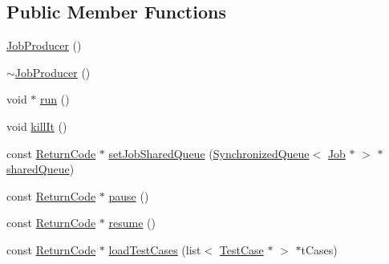 \subsection*{Public Member Functions}
\begin{DoxyCompactItemize}
\item 
\hyperlink{classit_1_1testbench_1_1rte_1_1JobProducer_a5632a8fd49a9c6f6d6ffcc5aa0037791}{Job\-Producer} ()
\item 
\hyperlink{classit_1_1testbench_1_1rte_1_1JobProducer_a46af385e038be508f33fa244d8d4349a}{$\sim$\-Job\-Producer} ()
\item 
void $\ast$ \hyperlink{classit_1_1testbench_1_1rte_1_1JobProducer_a48012263e93f1bcc93f8b0712e6b038a}{run} ()
\item 
void \hyperlink{classit_1_1testbench_1_1rte_1_1JobProducer_ad2c504317992d48438484898ee33b8d8}{kill\-It} ()
\item 
const \hyperlink{structit_1_1testbench_1_1data_1_1ReturnCode}{Return\-Code} $\ast$ \hyperlink{classit_1_1testbench_1_1rte_1_1JobProducer_aefb80f7b51d3ea1ec2771d389e727fa1}{set\-Job\-Shared\-Queue} (\hyperlink{classit_1_1testbench_1_1rte_1_1SynchronizedQueue}{Synchronized\-Queue}$<$ \hyperlink{classit_1_1testbench_1_1rte_1_1Job}{Job} $\ast$ $>$ $\ast$\hyperlink{classit_1_1testbench_1_1rte_1_1JobProducer_a10a14d85ca5c22ff91f92ebf32d4801a}{shared\-Queue})
\item 
const \hyperlink{structit_1_1testbench_1_1data_1_1ReturnCode}{Return\-Code} $\ast$ \hyperlink{classit_1_1testbench_1_1rte_1_1JobProducer_a731e79f717742662a2fc6663c464632f}{pause} ()
\item 
const \hyperlink{structit_1_1testbench_1_1data_1_1ReturnCode}{Return\-Code} $\ast$ \hyperlink{classit_1_1testbench_1_1rte_1_1JobProducer_a9bb9347aef66c443e43fcf2d79cd00b2}{resume} ()
\item 
const \hyperlink{structit_1_1testbench_1_1data_1_1ReturnCode}{Return\-Code} $\ast$ \hyperlink{classit_1_1testbench_1_1rte_1_1JobProducer_aa927fbe4070e096436d9c8706cebcabc}{load\-Test\-Cases} (list$<$ \hyperlink{classit_1_1testbench_1_1data_1_1TestCase}{Test\-Case} $\ast$ $>$ $\ast$t\-Cases)
\end{DoxyCompactItemize}

